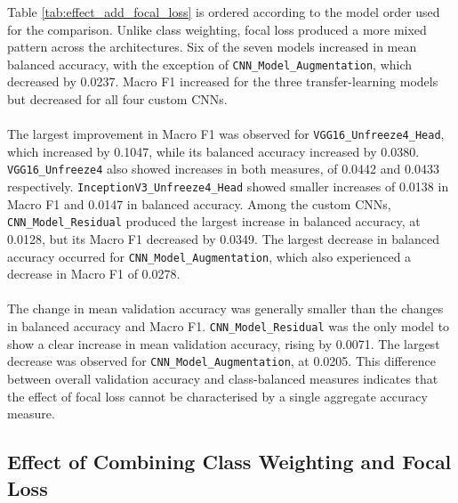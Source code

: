 \documentclass[12pt, a4paper]{report}
\let\oldsubsection\subsection
\renewcommand{\subsection}{%
    \Needspace{6\baselineskip}%
    \oldsubsection
}
\begin{document}
				Table \ref{tab:effect_add_focal_loss} is ordered according to the model order used for the comparison. Unlike class weighting, focal loss produced a more mixed pattern across the architectures. Six of the seven models increased in mean balanced accuracy, with the exception of \texttt{CNN\_Model\_Augmentation}, which decreased by 0.0237. Macro F1 increased for the three transfer-learning models but decreased for all four custom CNNs.\\\\
				The largest improvement in Macro F1 was observed for \texttt{VGG16\_Unfreeze4\_Head}, which increased by 0.1047, while its balanced accuracy increased by 0.0380. \\\texttt{VGG16\_Unfreeze4} also showed increases in both measures, of 0.0442 and 0.0433 respectively. \texttt{InceptionV3\_Unfreeze4\_Head} showed smaller increases of 0.0138 in Macro F1 and 0.0147 in balanced accuracy. Among the custom CNNs, \\\texttt{CNN\_Model\_Residual} produced the largest increase in balanced accuracy, at 0.0128, but its Macro F1 decreased by 0.0349. The largest decrease in balanced accuracy occurred for \texttt{CNN\_Model\_Augmentation}, which also experienced a decrease in Macro F1 of 0.0278.\\\\
				The change in mean validation accuracy was generally smaller than the changes in balanced accuracy and Macro F1. \texttt{CNN\_Model\_Residual} was the only model to show a clear increase in mean validation accuracy, rising by 0.0071. The largest decrease was observed for \texttt{CNN\_Model\_Augmentation}, at 0.0205. This difference between overall validation accuracy and class-balanced measures indicates that the effect of focal loss cannot be characterised by a single aggregate accuracy measure.
				
			\subsection{Effect of Combining Class Weighting and Focal Loss}
				
\end{document}
